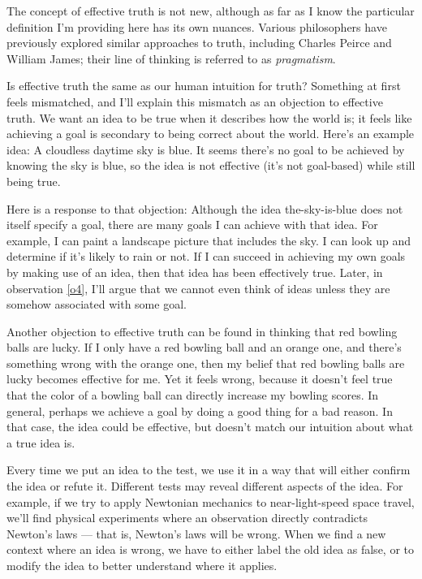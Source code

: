\documentclass[11pt, oneside]{article}   	%
\begin{document}
The concept of effective truth is not new, although as far as I know the
particular definition I'm providing here has its own nuances.
Various philosophers have previously
explored similar approaches to truth, including Charles Peirce and William
James; their line of thinking is referred to as {\em pragmatism}.

Is effective truth the same as our human intuition for truth?
Something at first feels mismatched, and I'll explain this mismatch as an
objection to effective truth.
We want an idea to be true when it describes how the world is;
it feels like achieving a goal is secondary to being
correct about the world.
Here's an example idea: A cloudless daytime sky is blue.
It seems there's no goal to be achieved by knowing the sky is blue,
so the idea is not effective (it's not goal-based) while
still being true.

Here is a response to that objection:
Although the idea the-sky-is-blue does not itself specify a goal, there
are many goals I can achieve with that idea. For example, I can paint a
landscape picture that includes the sky.
I can look up and determine if it's likely to rain or not.
If I can succeed in achieving my own goals by making use of an
idea, then that idea has been effectively true.
Later, in observation \ref{o4}, I'll argue that we cannot even think of ideas
unless they are somehow associated with some goal.

Another objection to effective truth can be found in thinking that red bowling
balls are lucky.
If I only have a red bowling ball and an orange one,
and there's
something wrong with the orange one, then my belief that red bowling balls are
lucky becomes effective for me.
Yet it feels wrong, because it doesn't feel true
that the color of a bowling ball can directly increase my bowling scores.
In general, perhaps we achieve a goal by doing a good thing for a bad reason.
In that case, the idea could be effective, but doesn't match our intuition about
what a true idea is.

Every time we put an idea to the test, we use it in a way that will either
confirm the idea or refute it. Different tests may reveal different aspects of
the idea. For example, if we try to apply Newtonian mechanics to
near-light-speed space travel, we'll find physical experiments where an
observation directly contradicts Newton's laws --- that is, Newton's laws will
be wrong.
When we find a new context where an idea is wrong, we have to either
label the old idea as false, or to modify the idea to
better understand where it applies.
\end{document}
